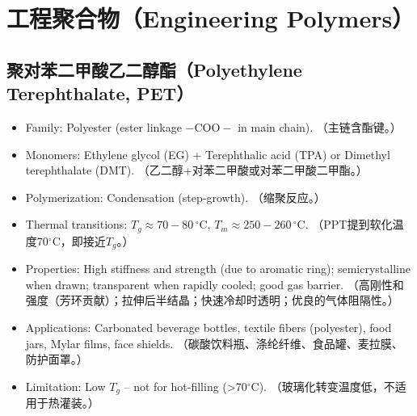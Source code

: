 \documentclass[12pt,a4paper]{ctexart}
\begin{document}
\section{工程聚合物（Engineering Polymers）}

\subsection{聚对苯二甲酸乙二醇酯（Polyethylene Terephthalate, PET）}
\begin{itemize}[leftmargin=*]
    \item Family: Polyester (ester linkage $-\mathrm{COO}-$ in main chain). （主链含酯键。）
    \item Monomers: Ethylene glycol (EG) + Terephthalic acid (TPA) or Dimethyl terephthalate (DMT). （乙二醇+对苯二甲酸或对苯二甲酸二甲酯。）
    \item Polymerization: Condensation (step-growth). （缩聚反应。）
    \item Thermal transitions: $T_g \approx 70-80\,^\circ$C, $T_m \approx 250-260\,^\circ$C. （PPT提到软化温度70$^\circ$C，即接近$T_g$。）
    \item Properties: High stiffness and strength (due to aromatic ring); semicrystalline when drawn; transparent when rapidly cooled; good gas barrier. （高刚性和强度（芳环贡献）；拉伸后半结晶；快速冷却时透明；优良的气体阻隔性。）
    \item Applications: Carbonated beverage bottles, textile fibers (polyester), food jars, Mylar films, face shields. （碳酸饮料瓶、涤纶纤维、食品罐、麦拉膜、防护面罩。）
    \item Limitation: Low $T_g$ – not for hot-filling (>70$^\circ$C). （玻璃化转变温度低，不适用于热灌装。）
\end{itemize}
\end{document}
